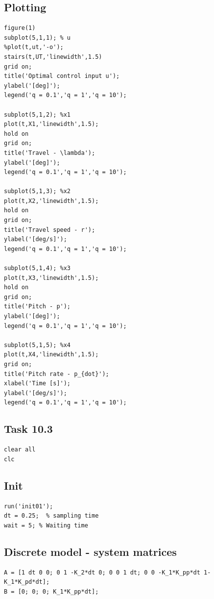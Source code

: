 \documentclass[11pt,a4paper,USenglish]{article} %
\begin{document}
\subsection*{Plotting}

\begin{verbatim}
figure(1)
subplot(5,1,1); % u
%plot(t,ut,'-o');
stairs(t,UT,'linewidth',1.5)
grid on;
title('Optimal control input u');
ylabel('[deg]');
legend('q = 0.1','q = 1','q = 10');

subplot(5,1,2); %x1
plot(t,X1,'linewidth',1.5);
hold on
grid on;
title('Travel - \lambda');
ylabel('[deg]');
legend('q = 0.1','q = 1','q = 10');

subplot(5,1,3); %x2
plot(t,X2,'linewidth',1.5);
hold on
grid on;
title('Travel speed - r');
ylabel('[deg/s]');
legend('q = 0.1','q = 1','q = 10');

subplot(5,1,4); %x3
plot(t,X3,'linewidth',1.5);
hold on
grid on;
title('Pitch - p');
ylabel('[deg]');
legend('q = 0.1','q = 1','q = 10');

subplot(5,1,5); %x4
plot(t,X4,'linewidth',1.5);
grid on;
title('Pitch rate - p_{dot}');
xlabel('Time [s]');
ylabel('[deg/s]');
legend('q = 0.1','q = 1','q = 10');
\end{verbatim}


\subsection{Task 10.3}
\begin{verbatim}
clear all
clc
\end{verbatim}


\subsection*{Init}

\begin{verbatim}
run('init01');
dt = 0.25;  % sampling time
wait = 5; % Waiting time
\end{verbatim}


\subsection*{Discrete model - system matrices}

\begin{verbatim}
A = [1 dt 0 0; 0 1 -K_2*dt 0; 0 0 1 dt; 0 0 -K_1*K_pp*dt 1-K_1*K_pd*dt];
B = [0; 0; 0; K_1*K_pp*dt];
\end{verbatim}
\end{document}
